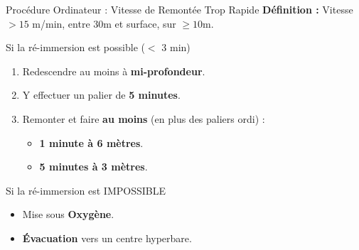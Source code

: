 \begin{frame}{Procédure Ordinateur : Vitesse de Remontée Trop Rapide}
    \small
    \textbf{Définition :} Vitesse $> 15$ m/min, entre 30m et surface, sur $\ge 10$m.

    \begin{block}{Si la ré-immersion est possible ($<$ 3 min)}
        \begin{enumerate}
            \item Redescendre au moins à \textbf{mi-profondeur}.
            \item Y effectuer un palier de \textbf{5 minutes}.
            \item Remonter et faire \textbf{au moins} (en plus des paliers ordi) :
            \begin{itemize}
                \item \textbf{1 minute à 6 mètres}.
                \item \textbf{5 minutes à 3 mètres}.
            \end{itemize}
        \end{enumerate}
    \end{block}

    \begin{alertblock}{Si la ré-immersion est IMPOSSIBLE}
        \begin{itemize}
            \item Mise sous \textbf{Oxygène}.
            \item \textbf{Évacuation} vers un centre hyperbare.
        \end{itemize}
    \end{alertblock}
\end{frame}

